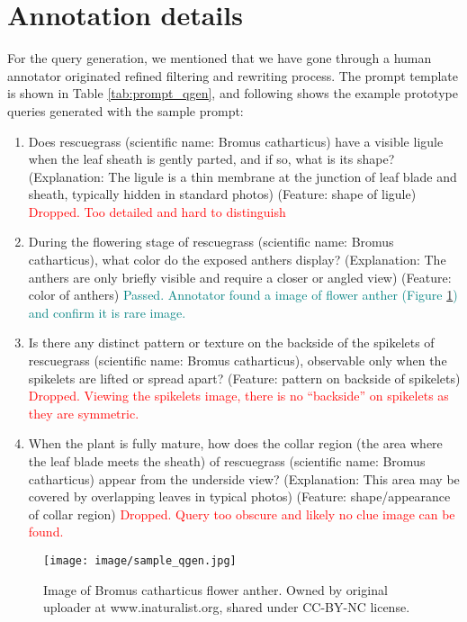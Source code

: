 \section{Annotation details}
\label{sec:app-anno}

For the query generation, we mentioned that we have gone through a human annotator originated refined filtering and rewriting process. The prompt template is shown in Table \ref{tab:prompt_qgen}, and following shows the example prototype queries generated with the sample prompt:

\begin{enumerate}
    \item Does rescuegrass (scientific name: Bromus catharticus) have a visible ligule when the leaf sheath is gently parted, and if so, what is its shape? (Explanation: The ligule is a thin membrane at the junction of leaf blade and sheath, typically hidden in standard photos) (Feature: shape of ligule) \textcolor{red}{Dropped. Too detailed and hard to distinguish}

    \item During the flowering stage of rescuegrass (scientific name: Bromus catharticus), what color do the exposed anthers display? (Explanation: The anthers are only briefly visible and require a closer or angled view) (Feature: color of anthers) \textcolor{teal}{Passed. Annotator found a image of flower anther (Figure \ref{fig:sample_qgen})  and confirm it is rare image.}

    \item Is there any distinct pattern or texture on the backside of the spikelets of rescuegrass (scientific name: Bromus catharticus), observable only when the spikelets are lifted or spread apart? (Feature: pattern on backside of spikelets) \textcolor{red}{Dropped. Viewing the spikelets image, there is no ``backside'' on spikelets as they are symmetric.}

    \item When the plant is fully mature, how does the collar region (the area where the leaf blade meets the sheath) of rescuegrass (scientific name: Bromus catharticus) appear from the underside view? (Explanation: This area may be covered by overlapping leaves in typical photos) (Feature: shape/appearance of collar region) \textcolor{red}{Dropped. Query too obscure and likely no clue image can be found.}
\end{enumerate}

\begin{figure}[h]
    \centering
    \texttt{[image: image/sample\_qgen.jpg]}
    \caption{Image of Bromus catharticus flower anther. Owned by original uploader at www.inaturalist.org, shared under CC-BY-NC license.}
    \label{fig:sample_qgen}
\end{figure}

